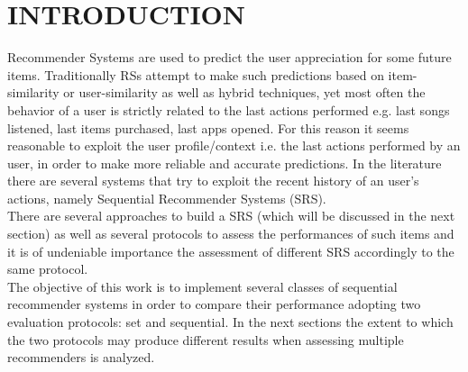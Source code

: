 \documentclass[prodmode,acmtecs]{acmsmall} %
\begin{document}
\section{INTRODUCTION}
Recommender Systems are used to predict the user appreciation for some future items. Traditionally RSs attempt to make such predictions based on item-similarity or user-similarity as well as hybrid techniques, yet most often the behavior of a user is strictly related to the last actions performed e.g. last songs listened, last items purchased, last apps opened. For this reason it seems reasonable to exploit the user profile/context i.e. the last actions performed by an user, in order to make more reliable and accurate predictions. In the literature there are several systems that try to exploit the recent history of an user's actions, namely Sequential Recommender Systems (SRS).\\There are several approaches to build a SRS (which will be discussed in the next section) as well as several protocols to assess the performances of such items and it is of undeniable importance the assessment of different SRS accordingly to the same protocol.
\\
The objective of this work is to implement several classes of sequential recommender systems in order to compare their performance adopting two evaluation protocols: set and sequential. In the next sections the extent to which the two protocols may produce different results when assessing multiple recommenders is analyzed.
\end{document}
